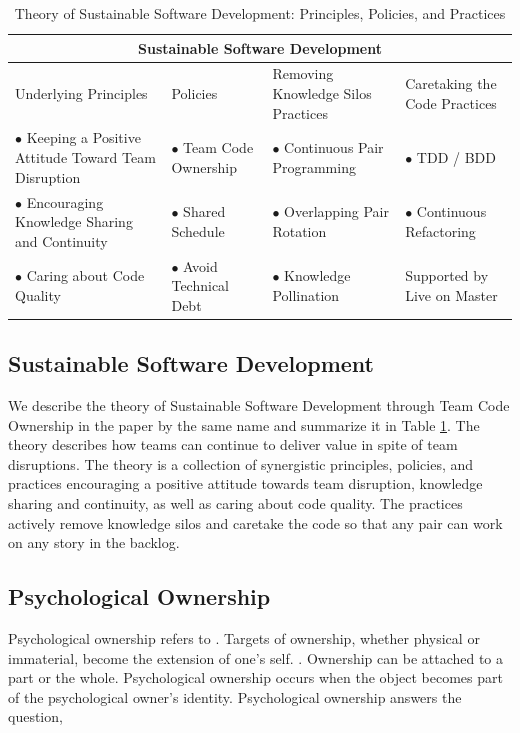 \begin{table}[t]
\renewcommand{\arraystretch}{1.5}
\centering
\caption{Theory of Sustainable Software Development: Principles, Policies, and Practices}
\label{SustainableSoftwareDevelopmentTable}
\begin{tabular}{|p{1.65in}|p{1.35in}|p{1.8in}|p{1.6in}|}
\hline
\multicolumn{4}{|c|}{Sustainable Software Development}                     \\
\hline
Underlying Principles & Policies                  & Removing Knowledge Silos Practices & Caretaking the Code Practices       \\
$\bullet$ Keeping a Positive Attitude Toward Team Disruption & $\bullet$ Team Code Ownership & $\bullet$ Continuous Pair Programming         & $\bullet$  TDD / BDD                   \\
$\bullet$ Encouraging Knowledge Sharing and Continuity & $\bullet$ Shared Schedule           & $\bullet$ Overlapping Pair Rotation & $\bullet$ Continuous Refactoring      \\
$\bullet$ Caring about Code Quality  & $\bullet$ Avoid Technical Debt      & $\bullet$  Knowledge Pollination    & Supported by Live on Master \\ 
\hline
\end{tabular}
\end{table}

\subsection{Sustainable Software Development}
\label{SustainableSoftwareDevelopmentTheory}
We describe the theory of Sustainable Software Development through Team Code Ownership in the paper by the same name \cite{SustainableSoftwareDevelopment} and summarize it in Table \ref{SustainableSoftwareDevelopmentTable}. The theory describes how teams can continue to deliver value in spite of team disruptions. The theory is a collection of synergistic principles, policies, and practices encouraging a positive attitude towards team disruption, knowledge sharing and continuity, as well as caring about code quality. The practices actively remove knowledge silos and caretake the code so that any pair can work on any story in the backlog. 

\subsection{Psychological Ownership}
Psychological ownership refers to  \cite{Pierce2001}. Targets of ownership, whether physical or immaterial, become the extension of one's self.  \cite{Isaacs1933}. Ownership can be attached to a part or the whole. Psychological ownership occurs when the object becomes part of the psychological owner's identity. Psychological ownership answers the question, 


